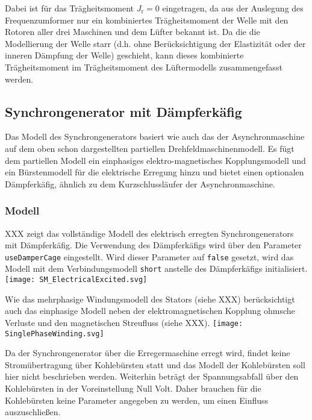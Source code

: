 Dabei ist für das Trägheitsmoment \(J_{\mathrm{r}}=0\) eingetragen, da
aus der Auslegung des Frequenzumformer nur ein kombiniertes
Trägheitsmoment der Welle mit den Rotoren aller drei Maschinen und dem
Lüfter bekannt ist. Da die die Modellierung der Welle starr (d.h. ohne
Berücksichtigung der Elastizität oder der inneren Dämpfung der Welle)
geschieht, kann dieses kombinierte Trägheitsmoment im Trägheitsmoment
des Lüftermodells zusammengefasst werden.

\hypertarget{synchrongenerator-mit-duxe4mpferkuxe4fig}{%
\subsection{Synchrongenerator mit
Dämpferkäfig}\label{synchrongenerator-mit-duxe4mpferkuxe4fig}}

Das Modell des Synchrongenerators basiert wie auch das der
Asynchronmaschine auf dem oben schon dargestellten partiellen
Drehfeldmaschinenmodell. Es fügt dem partiellen Modell ein einphasiges
elektro-magnetisches Kopplungsmodell und ein Bürstenmodell für die
elektrische Erregung hinzu und bietet einen optionalen Dämpferkäfig,
ähnlich zu dem Kurzschlussläufer der Asynchronmaschine.

\hypertarget{modell-1}{%
\subsubsection{Modell}\label{modell-1}}

XXX zeigt das vollständige Modell des elektrisch erregten
Synchrongenerators mit Dämpferkäfig. Die Verwendung des Dämpferkäfigs
wird über den Parameter \texttt{useDamperCage} eingestellt. Wird dieser
Parameter auf \texttt{false} gesetzt, wird das Modell mit dem
Verbindungsmodell \texttt{short} anstelle des Dämpferkäfigs
initialisiert. \texttt{[image: SM\_ElectricalExcited.svg]}

Wie das mehrphasige Windungsmodell des Stators (siehe XXX)
berücksichtigt auch das einphasige Modell neben der elektromagnetischen
Kopplung ohmsche Verluste und den magnetischen Streufluss (siehe XXX).
\texttt{[image: SinglePhaseWinding.svg]}

Da der Synchrongenerator über die Erregermaschine erregt wird, findet
keine Stromübertragung über Kohlebürsten statt und das Modell der
Kohlebürsten soll hier nicht beschrieben werden. Weiterhin beträgt der
Spannungsabfall über den Kohlebürsten in der Voreinstellung Null Volt.
Daher brauchen für die Kohlebürsten keine Parameter angegeben zu werden,
um einen Einfluss auszuschließen.

